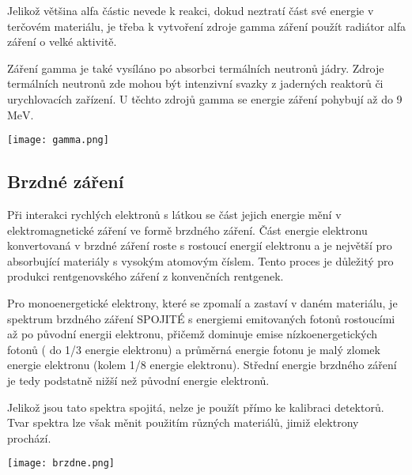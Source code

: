 \documentclass[../../main.tex]{subfiles}
\begin{document}
Jelikož většina alfa částic nevede k reakci, dokud neztratí část své energie v terčovém materiálu, je třeba k vytvoření zdroje gamma záření použít radiátor alfa záření o velké aktivitě.

Záření gamma je také vysíláno po absorbci termálních neutronů jádry. Zdroje termálních neutronů zde mohou být intenzivní svazky z jaderných reaktorů či urychlovacích zařízení. U těchto zdrojů gamma se energie záření pohybují až do 9 $\mathrm{MeV}$. 
 
\begin{center}
 	\texttt{[image: gamma.png]}
\end{center}

\subsection{Brzdné záření} 

Při interakci rychlých elektronů s látkou se část jejich energie mění v elektromagnetické záření ve formě brzdného záření. Část energie elektronu konvertovaná v brzdné záření roste s rostoucí energií elektronu a je největší pro absorbující materiály s vysokým atomovým číslem. Tento proces je důležitý pro produkci rentgenovského záření z konvenčních rentgenek. 

Pro monoenergetické elektrony, které se zpomalí a zastaví v daném materiálu, je spektrum brzdného záření SPOJITÉ s energiemi emitovaných fotonů rostoucími až po původní energii elektronu, přičemž dominuje emise nízkoenergetických fotonů ( do 1/3 energie elektronu) a průměrná energie fotonu je malý zlomek energie elektronu (kolem 1/8 energie elektronu). Střední energie brzdného záření je tedy podstatně nižší než původní energie elektronů.

Jelikož jsou tato spektra spojitá, nelze je použít přímo ke kalibraci detektorů. Tvar spektra lze však měnit použitím různých materiálů, jimiž elektrony prochází.

 \begin{center}
 	\texttt{[image: brzdne.png]}
 \end{center} 
\end{document}
